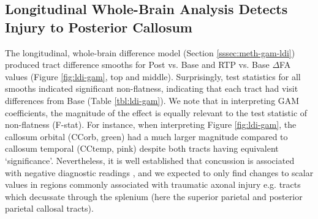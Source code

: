 \documentclass[12pt]{article}
\begin{document}
\subsection{Longitudinal Whole-Brain Analysis Detects Injury to Posterior Callosum}
\label{ssec:res-dwi-wba}
The longitudinal, whole-brain difference model (Section \ref{sssec:meth-gam-ldi}) produced tract difference smooths for Post vs. Base and RTP vs. Base $\Delta$FA values (Figure \ref{fig:ldi-gam}, top and middle). Surprisingly, test statistics for all smooths indicated significant non-flatness, indicating that each tract had visit differences from Base (Table \ref{tbl:ldi-gam}). We note that in interpreting GAM coefficients, the magnitude of the effect is equally relevant to the test statistic of non-flatness (F-stat). For instance, when interpreting Figure \ref{fig:ldi-gam}, the callosum orbital (CCorb, green) had a much larger magnitude compared to callosum temporal (CCtemp, pink) despite both tracts having equivalent `significance'. Nevertheless, it is well established that concussion is associated with negative diagnostic readings \parencite[e.g.][]{klein2019PrevalencePotentiallyClinically}, and we expected to only find changes to scalar values in regions commonly associated with traumatic axonal injury e.g. tracts which decussate through the splenium (here the superior parietal and posterior parietal callosal tracts).
\end{document}
